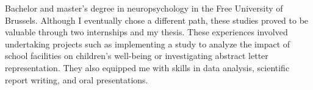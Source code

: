 \documentclass[11pt, oneside, a4paper, titlepage]{article}
\begin{document}
\begin{tcolorbox}[colframe=white, colback=white]
\begin{minipage}[t]{0.60\linewidth}
    \small{
      Bachelor and master's degree in neuropsychology in the Free University 
      of Brussels. Although I eventually chose a different path, these studies 
      proved to be valuable through two internships and my thesis. These experiences 
      involved undertaking projects such as implementing a study to analyze the 
      impact of school facilities on children's well-being or investigating 
      abstract letter representation. They also equipped me with skills in data 
      analysis, scientific report writing, and oral presentations.
    }

  \end{minipage}

\end{tcolorbox}
\end{document}
